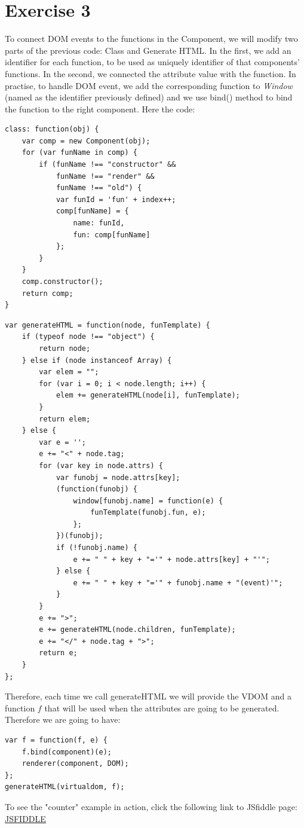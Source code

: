 \documentclass[10pt]{article}
\begin{document}
\section*{Exercise 3}
To connect DOM events to the functions in the Component, we will modify two parts of the previous code: Class and Generate HTML. In the first, we add an identifier for each function, to be used as uniquely identifier of that components' functions. In the second, we connected the attribute value with the function. In practise, to handle DOM event, we add the corresponding function to \textit{Window} (named as the identifier previously defined) and we use bind() method to bind the function to the right component. Here the code: 
\begin{lstlisting}[caption=New class]
class: function(obj) {
    var comp = new Component(obj);
    for (var funName in comp) {
        if (funName !== "constructor" &&
            funName !== "render" &&
            funName !== "old") {
            var funId = 'fun' + index++;
            comp[funName] = {
                name: funId,
                fun: comp[funName]
            };
        }
    }
    comp.constructor();
    return comp;
}
\end{lstlisting}  
\begin{lstlisting}[caption=New generateHTML]
var generateHTML = function(node, funTemplate) {
    if (typeof node !== "object") {
        return node;
    } else if (node instanceof Array) {
        var elem = "";
        for (var i = 0; i < node.length; i++) {
            elem += generateHTML(node[i], funTemplate);
        }
        return elem;
    } else {
        var e = '';
        e += "<" + node.tag;
        for (var key in node.attrs) {
            var funobj = node.attrs[key];
            (function(funobj) {
                window[funobj.name] = function(e) {
                    funTemplate(funobj.fun, e);
                };
            })(funobj);
            if (!funobj.name) {
                e += " " + key + "='" + node.attrs[key] + "'";
            } else {
                e += " " + key + "='" + funobj.name + "(event)'";
            }
        }
        e += ">";
        e += generateHTML(node.children, funTemplate);
        e += "</" + node.tag + ">";
        return e;
    }
};
\end{lstlisting}   
Therefore, each time we call generateHTML we will provide the VDOM and a function $f$ that will be used when the attributes are going to be generated. Therefore we are going to have:
\begin{lstlisting}[caption=how to call generate HTML]
var f = function(f, e) {
    f.bind(component)(e);
    renderer(component, DOM);
};
generateHTML(virtualdom, f);
\end{lstlisting}   
To see the "counter" example in action, click the following link to JSfiddle page: \href{https://jsfiddle.net/gnu8oaob/}{JSFIDDLE}
\end{document}

